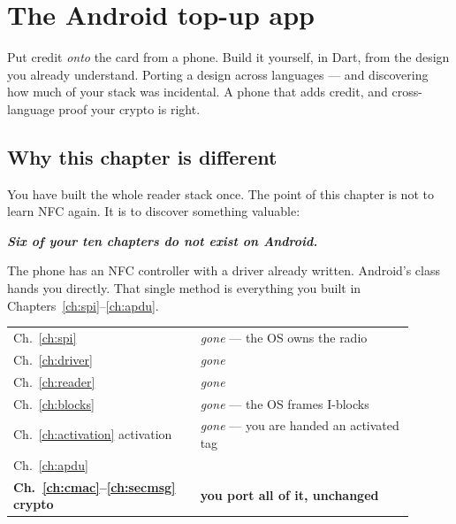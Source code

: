 \chapter{The Android top-up app}
\label{ch:android}

\chapterbrief
  {Put credit \emph{onto} the card from a phone. Build it yourself, in Dart, from the design you already understand.}
  {Porting a design across languages --- and discovering how much of your stack was incidental.}
  {A phone that adds credit, and cross-language proof your crypto is right.}

\section{Why this chapter is different}

You have built the whole reader stack once. The point of this chapter is not to
learn NFC again. It is to discover something valuable:

\begin{center}\bfseries\itshape
Six of your ten chapters do not exist on Android.
\end{center}

The phone has an NFC controller with a driver already written. Android's
 class hands you  directly. That
single method is everything you built in Chapters~\ref{ch:spi}--\ref{ch:apdu}.

\begin{center}\small
\begin{tabular}{@{}L{0.42\linewidth}L{0.48\linewidth}@{}}
\toprule
{} &  \\
\midrule
Ch.~\ref{ch:spi}          & \emph{gone} --- the OS owns the radio \\
Ch.~\ref{ch:driver}   & \emph{gone} \\
Ch.~\ref{ch:reader}   & \emph{gone} \\
Ch.~\ref{ch:blocks} & \emph{gone} --- the OS frames I-blocks \\
Ch.~\ref{ch:activation} activation      & \emph{gone} --- you are handed an activated tag \\
Ch.~\ref{ch:apdu}   & \textbf{} \\
\midrule
\textbf{Ch.~\ref{ch:cmac}--\ref{ch:secmsg} crypto} & \textbf{you port all of it, unchanged} \\
\bottomrule
\end{tabular}
\end{center}

